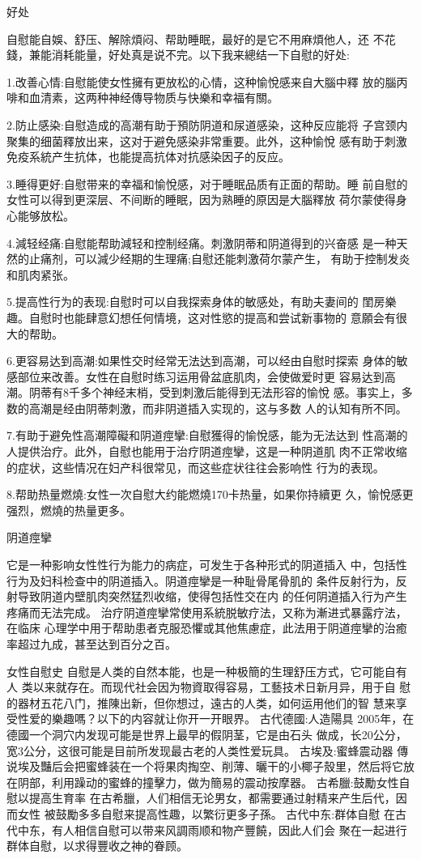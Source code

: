 \documentclass[12pt,UTF8]{ctexbook}
\begin{document}
好处

自慰能自娛、舒压、解除煩闷、帮助睡眠，最好的是它不用麻煩他人，还
不花錢，兼能消耗能量，好处真是说不完。以下我来總结一下自慰的好处:

1.改善心情:自慰能使女性擁有更放松的心情，这种愉悅感来自大腦中釋
放的腦丙啡和血清素，这两种神经傳导物质与快樂和幸福有關。

2.防止感染:自慰造成的高潮有助于預防阴道和尿道感染，这种反应能将
子宫颈内聚集的细菌釋放出来，这对于避免感染非常重要。此外，这种愉悅
感有助于刺激免疫系統产生抗体，也能提高抗体对抗感染因子的反应。

3.睡得更好:自慰带来的幸福和愉悅感，对于睡眠品质有正面的帮助。睡
前自慰的女性可以得到更深层、不间断的睡眠，因为熟睡的原因是大腦釋放
荷尔蒙使得身心能够放松。

4.減轻经痛:自慰能帮助減轻和控制经痛。刺激阴蒂和阴道得到的兴奋感
是一种天然的止痛剂，可以減少经期的生理痛;自慰还能刺激荷尔蒙产生，
有助于控制发炎和肌肉紧张。

5.提高性行为的表现:自慰时可以自我探索身体的敏感处，有助夫妻间的
閨房樂趣。自慰时也能肆意幻想任何情境，这对性慾的提高和尝试新事物的
意願会有很大的帮助。

6.更容易达到高潮:如果性交时经常无法达到高潮，可以经由自慰时探索
身体的敏感部位来改善。女性在自慰时练习运用骨盆底肌肉，会使做爱时更
容易达到高潮。阴蒂有8千多个神经末梢，受到刺激后能得到无法形容的愉悅
感。事实上，多数的高潮是经由阴蒂刺激，而非阴道插入实现的，这与多数
人的认知有所不同。

7.有助于避免性高潮障礙和阴道痙攣:自慰獲得的愉悅感，能为无法达到
性高潮的人提供治疗。此外，自慰也能用于治疗阴道痙攣，这是一种阴道肌
肉不正常收缩的症状，这些情况在妇产科很常见，而这些症状往往会影响性
行为的表现。

8.帮助热量燃燒:女性一次自慰大约能燃燒170卡热量，如果你持續更
久，愉悅感更强烈，燃燒的热量更多。

阴道痙攣

它是一种影响女性性行为能力的病症，可发生于各种形式的阴道插入
中，包括性行为及妇科检查中的阴道插入。阴道痙攣是一种耻骨尾骨肌的
条件反射行为，反射导致阴道内壁肌肉突然猛烈收缩，使得包括性交在内
的任何阴道插入行为产生疼痛而无法完成。
治疗阴道痙攣常使用系統脱敏疗法，又称为漸进式暴露疗法，在临床
心理学中用于帮助患者克服恐懼或其他焦慮症，此法用于阴道痙攣的治癒
率超过九成，甚至达到百分之百。

女性自慰史
自慰是人类的自然本能，也是一种极簡的生理舒压方式，它可能自有人
类以来就存在。而现代社会因为物資取得容易，工藝技术日新月异，用于自
慰的器材五花八门，推陳出新，但你想过，遠古的人类，如何运用他们的智
慧来享受性爱的樂趣嗎？以下的内容就让你开一开眼界。
古代德國:人造陽具
2005年，在德國一个洞穴内发现可能是世界上最早的假阴茎，它是由石头
做成，长20公分，宽3公分，这很可能是目前所发现最古老的人类性爱玩具。
古埃及:蜜蜂震动器
傳说埃及豔后会把蜜蜂装在一个将果肉掏空、削薄、曬干的小椰子殼里，然后将它放在阴部，利用躁动的蜜蜂的撞擊力，做为簡易的震动按摩器。
古希臘:鼓勵女性自慰以提高生育率
在古希臘，人们相信无论男女，都需要通过射精来产生后代，因而女性
被鼓勵多多自慰来提高性趣，以繁衍更多子孫。
古代中东:群体自慰
在古代中东，有人相信自慰可以带来风調雨顺和物产豐饒，因此人们会
聚在一起进行群体自慰，以求得豐收之神的眷顾。
\end{document}
